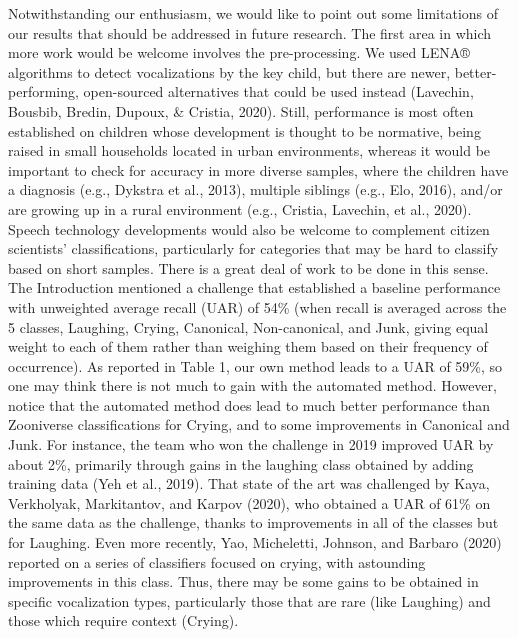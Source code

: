 \documentclass[english,,man]{apa6}
\begin{document}
Notwithstanding our enthusiasm, we would like to point out some limitations of our results that should be addressed in future research. The first area in which more work would be welcome involves the pre-processing. We used LENA® algorithms to detect vocalizations by the key child, but there are newer, better-performing, open-sourced alternatives that could be used instead (Lavechin, Bousbib, Bredin, Dupoux, \& Cristia, 2020). Still, performance is most often established on children whose development is thought to be normative, being raised in small households located in urban environments, whereas it would be important to check for accuracy in more diverse samples, where the children have a diagnosis (e.g., Dykstra et al., 2013), multiple siblings (e.g., Elo, 2016), and/or are growing up in a rural environment (e.g., Cristia, Lavechin, et al., 2020). Speech technology developments would also be welcome to complement citizen scientists' classifications, particularly for categories that may be hard to classify based on short samples. There is a great deal of work to be done in this sense. The Introduction mentioned a challenge that established a baseline performance with unweighted average recall (UAR) of 54\% (when recall is averaged across the 5 classes, Laughing, Crying, Canonical, Non-canonical, and Junk, giving equal weight to each of them rather than weighing them based on their frequency of occurrence). As reported in Table 1, our own method leads to a UAR of 59\%, so one may think there is not much to gain with the automated method. However, notice that the automated method does lead to much better performance than Zooniverse classifications for Crying, and to some improvements in Canonical and Junk. For instance, the team who won the challenge in 2019 improved UAR by about 2\%, primarily through gains in the laughing class obtained by adding training data (Yeh et al., 2019). That state of the art was challenged by Kaya, Verkholyak, Markitantov, and Karpov (2020), who obtained a UAR of 61\% on the same data as the challenge, thanks to improvements in all of the classes but for Laughing. Even more recently, Yao, Micheletti, Johnson, and Barbaro (2020) reported on a series of classifiers focused on crying, with astounding improvements in this class. Thus, there may be some gains to be obtained in specific vocalization types, particularly those that are rare (like Laughing) and those which require context (Crying).
\end{document}
